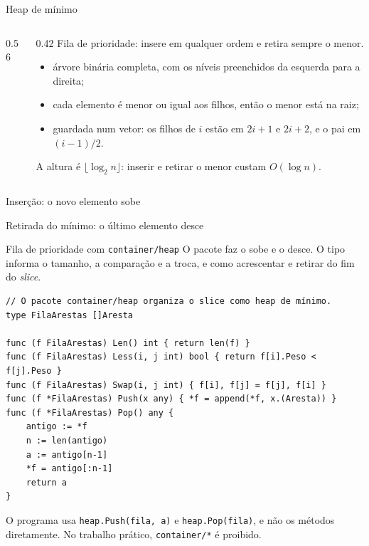 \documentclass{beamer}
\begin{document}
\begin{frame}{Heap de mínimo}
	\begin{columns}[c,onlytextwidth]
		\begin{column}{0.56\textwidth}
			\centering
		\end{column}
		\begin{column}{0.42\textwidth}
			\footnotesize
			Fila de prioridade: insere em qualquer ordem e retira sempre o
			menor.
			\begin{itemize}
				\item árvore binária completa, com os níveis preenchidos da
				      esquerda para a direita;
				\item cada elemento é menor ou igual aos filhos, então o menor
				      está na raiz;
				\item guardada num vetor: os filhos de $i$ estão em $2i+1$ e
				      $2i+2$, e o pai em $(i-1)/2$.
			\end{itemize}
			A altura é $\lfloor \log_2 n \rfloor$: inserir e retirar o menor
			custam $O(\log n)$.
		\end{column}
	\end{columns}
\end{frame}

\begin{frame}{Inserção: o novo elemento sobe}
	\begin{center}
	\end{center}
\end{frame}

\begin{frame}{Retirada do mínimo: o último elemento desce}
	\begin{center}
	\end{center}
\end{frame}

\begin{frame}[fragile]{Fila de prioridade com \texttt{container/heap}}
	\small
	O pacote faz o sobe e o desce. O tipo informa o tamanho, a comparação e a
	troca, e como acrescentar e retirar do fim do \textit{slice}.

	\begin{verbatim}
// O pacote container/heap organiza o slice como heap de mínimo.
type FilaArestas []Aresta

func (f FilaArestas) Len() int { return len(f) }
func (f FilaArestas) Less(i, j int) bool { return f[i].Peso < f[j].Peso }
func (f FilaArestas) Swap(i, j int) { f[i], f[j] = f[j], f[i] }
func (f *FilaArestas) Push(x any) { *f = append(*f, x.(Aresta)) }
func (f *FilaArestas) Pop() any {
	antigo := *f
	n := len(antigo)
	a := antigo[n-1]
	*f = antigo[:n-1]
	return a
}
\end{verbatim}
	\footnotesize
	O programa usa \texttt{heap.Push(fila, a)} e \texttt{heap.Pop(fila)}, e não
	os métodos diretamente. No trabalho prático, \texttt{container/*} é
	proibido.
\end{frame}
\end{document}

